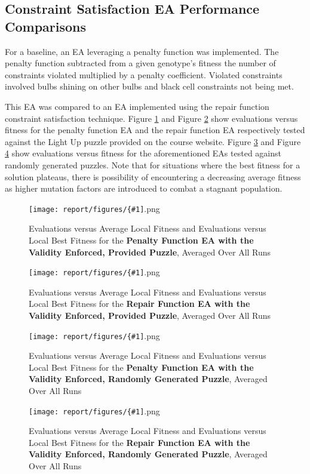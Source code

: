\documentclass[11pt]{article}
\newcommand{\fitnessplotcaption}[1]{\caption{Evaluations versus Average Local Fitness and Evaluations versus 
    Local Best Fitness for the \textbf{{#1}}, Averaged Over All Runs}}
\newcommand{\addgraphic}[1]{\centerline{\texttt{[image: report/figures/\{\#1]}.png}}}
\begin{document}
\subsection{Constraint Satisfaction EA Performance Comparisons}

For a baseline, an EA leveraging a penalty function was implemented. The penalty function
subtracted from a given genotype's fitness the number of constraints violated multiplied by a
penalty coefficient. Violated constraints involved bulbs shining on other bulbs and black cell
constraints not being met.

This EA was compared to an EA implemented using the repair function
constraint satisfaction technique. Figure \ref{fig:website_puzzle_validity_enforced_graph} and Figure 
\ref{fig:website_puzzle_validity_enforced_bonus_graph} show evaluations versus fitness for the 
penalty function EA and the repair function EA respectively tested against the Light Up puzzle provided
on the course website. Figure \ref{fig:random_gen_validity_enforced_graph} and Figure \ref{fig:random_gen_validity_enforced_bonus_graph} 
show evaluations versus fitness for the aforementioned EAs tested against randomly generated puzzles. Note that 
for situations where the best fitness for a solution plateaus, there is possibility of encountering a decreasing average fitness
as higher mutation factors are introduced to combat a stagnant population.

\begin{figure}[H]
    \addgraphic{website_puzzle_validity_enforced_graph}
    \fitnessplotcaption{Penalty Function EA with the Validity Enforced, Provided Puzzle}
    \label{fig:website_puzzle_validity_enforced_graph}
\end{figure}

\begin{figure}[H]
    \addgraphic{website_puzzle_validity_enforced_bonus_graph}
    \fitnessplotcaption{Repair Function EA with the Validity Enforced, Provided Puzzle}
    \label{fig:website_puzzle_validity_enforced_bonus_graph}
\end{figure}

\begin{figure}[H]
    \addgraphic{random_gen_validity_enforced_graph}
    \fitnessplotcaption{Penalty Function EA with the Validity Enforced, Randomly Generated Puzzle}
    \label{fig:random_gen_validity_enforced_graph}
\end{figure}

\begin{figure}[H]
    \addgraphic{random_gen_validity_enforced_bonus_graph}
    \fitnessplotcaption{Repair Function EA with the Validity Enforced, Randomly Generated Puzzle}
    \label{fig:random_gen_validity_enforced_bonus_graph}
\end{figure}
\end{document}
